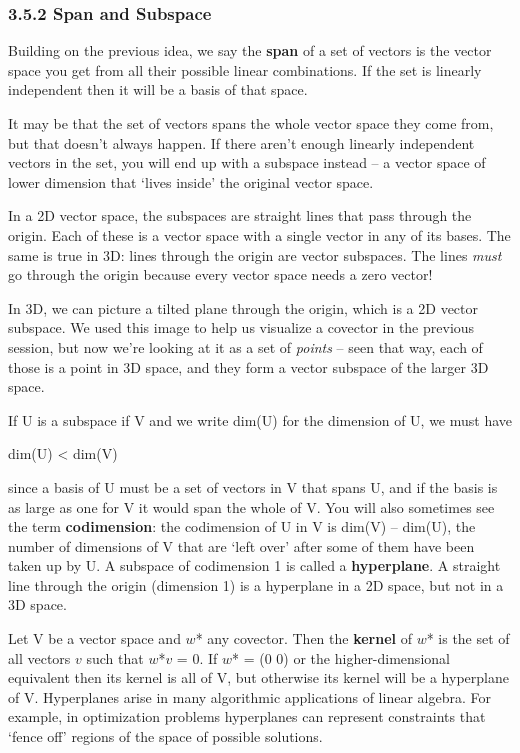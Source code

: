 \documentclass[oneside,english]{amsbook}
\numberwithin{section}{chapter}
\theoremstyle{plain}
\theoremstyle{definition}
\begin{document}
\subsubsection{3.5.2 Span and Subspace}\label{span-and-subspace}

Building on the previous idea, we say the \textbf{span} of a set of
vectors is the vector space you get from all their possible linear
combinations. If the set is linearly independent then it will be a basis
of that space.

It may be that the set of vectors spans the whole vector space they come
from, but that doesn't always happen. If there aren't enough linearly
independent vectors in the set, you will end up with a subspace instead
-- a vector space of lower dimension that `lives inside' the original
vector space.

In a 2D vector space, the subspaces are straight lines that pass through
the origin. Each of these is a vector space with a single vector in any
of its bases. The same is true in 3D: lines through the origin are
vector subspaces. The lines \emph{must} go through the origin because
every vector space needs a zero vector!

In 3D, we can picture a tilted plane through the origin, which is a 2D
vector subspace. We used this image to help us visualize a covector in
the previous session, but now we're looking at it as a set of
\emph{points} -- seen that way, each of those is a point in 3D space,
and they form a vector subspace of the larger 3D space.

If U is a subspace if V and we write dim(U) for the dimension of U, we
must have

dim(U) \textless{} dim(V)

since a basis of U must be a set of vectors in V that spans U, and if
the basis is as large as one for V it would span the whole of V. You
will also sometimes see the term \textbf{codimension}: the codimension
of U in V is dim(V) -- dim(U), the number of dimensions of V that are
`left over' after some of them have been taken up by U. A subspace of
codimension 1 is called a \textbf{hyperplane}. A straight line through
the origin (dimension 1) is a hyperplane in a 2D space, but not in a 3D
space.

Let V be a vector space and $w$* any covector. Then the
\textbf{kernel} of $w$* is the set of all vectors $v$ such that
$w$*$v$ = 0. If $w$* = (0 0) or the higher-dimensional
equivalent then its kernel is all of V, but otherwise its kernel will be
a hyperplane of V. Hyperplanes arise in many algorithmic applications of
linear algebra. For example, in optimization problems hyperplanes can
represent constraints that `fence off' regions of the space of
possible solutions.
\end{document}
